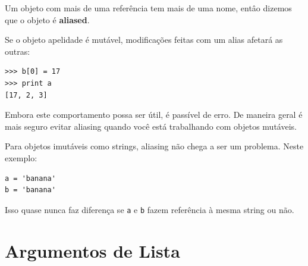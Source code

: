 

Um objeto com mais de uma referência tem mais de uma nome,
entâo dizemos que o objeto é {\bf aliased}.




Se o objeto apelidade é mutável,
modificações feitas com um alias 
afetará as outras:


\beforeverb
\begin{verbatim}
>>> b[0] = 17
>>> print a
[17, 2, 3]
\end{verbatim}
\afterverb
%
Embora este comportamento possa ser útil, é passível de erro. De maneira
geral é mais seguro evitar aliasing quando você está trabalhando com objetos mutáveis.




Para objetos imutáveis como strings, aliasing não chega a ser um problema. 
Neste exemplo:



\beforeverb
\begin{verbatim}
a = 'banana'
b = 'banana'
\end{verbatim}
\afterverb
%
Isso quase nunca faz diferença se {\tt a} e {\tt b} fazem referência à mesma string ou não.




\section{Argumentos de Lista}



